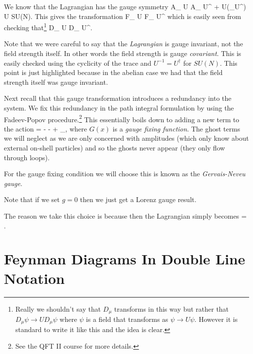 We know that the Lagrangian has the gauge symmetry 
\bse 
    A_{\mu} \to U A_{\mu} U^{\dagger} + U(\p_{\mu}U^{\dagger}) \qquad U \in SU(N).
\ese
This gives the transformation 
\bse 
    F_{\mu\nu} \to U F_{\mu\nu} U^{\dagger}
\ese
which is easily seen from checking that\footnote{Really we shouldn't say that $D_{\mu}$ transforms in this way but rather that $D_{\mu}\psi \to U D_{\mu} \psi$ where $\psi$ is a field that transforms as $\psi \to U \psi$. However it is standard to write it like this and the idea is clear.}
\bse 
    D_{\mu} \to U D_{\mu} U^{\dagger}.
\ese 

\br 
    Note that we were careful to say that the \textit{Lagrangian} is gauge invariant, not the field strength itself. In other words the field strength is gauge \textit{covariant}. This is easily checked using the cyclicity of the trace and $U^{-1}=U^{\dagger}$ for $SU(N)$. This point is just highlighted because in the abelian case we had that the field strength itself was gauge invariant.
\er 

Next recall that this gauge transformation introduces a redundancy into the system. We fix this redundancy in the path integral formulation by using the Fadeev-Popov procedure.\footnote{See the QFT II course for more details.} This essentially boils down to adding a new term to the action 
\bse 
    \cL = - \Tr[F_{\mu\nu}F^{\mu\nu}] - \Tr[G G] + \cL_{},
\ese 
where $G(x)$ is a \textit{gauge fixing function}. The ghost terms we will neglect as we are only concerned with amplitudes (which only know about external on-shell particles) and so the ghosts never appear (they only flow through loops). 

For the gauge fixing condition we will choose 
\noindent this is known as the \textit{Gervais-Neveu gauge}. 

\br 
    Note that if we set $g=0$ then we just get a Lorenz gauge result. 
\er 

The reason we take this choice is because then the Lagrangian simply becomes 
\bse 
    \cL = . 
\ese 

\section{Feynman Diagrams In Double Line Notation}

